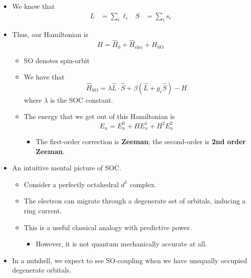 \documentclass[../notes.tex]{subfiles}
\begin{document}
\begin{itemize}
\begin{itemize}
\begin{itemize}
        \end{itemize}
    \end{itemize}
    \item We know that
    \begin{align*}
        L &= \sum_i\ell_i&
        S &= \sum_is_i
    \end{align*}
    \item Thus, our Hamiltonian is
    \begin{equation*}
        H = \hat{H}_0+\hat{H}_\text{elec}+\hat{H}_\text{SO}
    \end{equation*}
    \begin{itemize}
        \item SO denotes spin-orbit
        \item We have that
        \begin{equation*}
            \hat{H}_\text{SO} = \lambda\hat{L}\cdot\hat{S}+\beta(\hat{L}+g_e\hat{S})-H
        \end{equation*}
        where $\lambda$ is the SOC constant.
        \item The energy that we get out of this Hamiltonian is
        \begin{equation*}
            E_n = E_n^0+HE_n^1+H^2E_n^2
        \end{equation*}
        \begin{itemize}
            \item The first-order correction is \textbf{Zeeman}; the second-order is \textbf{2nd order Zeeman}.
        \end{itemize}
    \end{itemize}
    \item An intuitive mental picture of SOC.
    \begin{itemize}
        \item Consider a perfectly octahedral $d^1$ complex.
        \item The electron can migrate through a degenerate set of orbitals, inducing a ring current.
        \item This is a useful classical analogy with predictive power.
        \begin{itemize}
            \item However, it is not quantum mechanically accurate at all.
        \end{itemize}
    \end{itemize}
    \item In a nutshell, we expect to see SO-coupling when we have unequally occupied degenerate orbitals.

\end{itemize}
\end{document}

